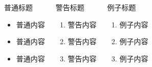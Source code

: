 \documentclass{styles/cuzbeamer}
\begin{document}
    \begin{frame}
        \begin{columns}[T,onlytextwidth]
            \begin{block}{普通标题}
                \begin{itemize}
                    \item 普通内容
                    \item 普通内容
                    \item 普通内容
                \end{itemize}
            \end{block}
            \begin{alertblock}{警告标题}
                \begin{enumerate}
                    \item 警告内容
                    \item 警告内容
                    \item 警告内容
                \end{enumerate}
            \end{alertblock}
            \begin{exampleblock}{例子标题}
                \begin{enumerate}
                    \item 例子内容
                    \item 例子内容
                    \item 例子内容
                \end{enumerate}
            \end{exampleblock}
        \end{columns}
    \end{frame}
\end{document}
